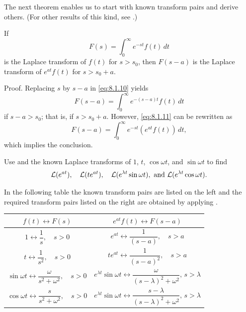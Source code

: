 The next theorem enables us to start with known transform pairs and derive
others. (For other results of this kind, see .)

\begin{theorem}\label{thmtype:8.1.3}
 If
\begin{equation}\label{eq:8.1.10}
F(s)=\int_0^\infty e^{-st} f(t)\,dt
\end{equation}
is the Laplace transform of $f(t)$ for $s>s_0$, then $F(s-a)$ is the
Laplace transform of $e^{at}f(t)$ for $s >s_0+a$.
\end{theorem}

{\sc Proof.} Replacing $s$ by $s-a$ in  \eqref{eq:8.1.10} yields
\begin{equation}\label{eq:8.1.11}
F(s-a)=\int_0^\infty e^{-(s-a)t}f(t)\,dt
\end{equation}
if $s-a>s_0$; that is, if $s>s_0+a$.  However,  \eqref{eq:8.1.11} can
be rewritten as
\[
F(s-a)=\int_0^\infty e^{-st}\left(e^{at}f(t)\right)\,dt,
\]
which implies the conclusion.

\begin{example}\label{example:8.1.7}
  Use  and the known Laplace
transforms of $1$, $t$, $\cos\omega t$, and $\sin\omega t$ to find
\[
{\mathcal L}(e^{at}),\quad {\mathcal L}(te^{at}),\quad {\mathcal L}(e^{\lambda t}\sin
\omega t),\text{ and }{\mathcal L}(e^{\lambda t}\cos\omega t).
\]
\end{example}

\begin{solution}
In the following table the known
transform pairs  are listed on the left and  the required  transform pairs
listed on the right are obtained  by applying
.%
%
\begin{center}
\renewcommand{\arraystretch}{1.8}
\begin{tabular}{c@{\qquad}c}\toprule
$f(t)\leftrightarrow F(s)$ & $e^{at}f(t)\leftrightarrow F(s-a)$ \\\midrule
$1\leftrightarrow\dfrac{1}{s},\quad s>0$ &
 $e^{at}\leftrightarrow\dfrac{1}{(s-a)},\quad s>a$\\
  $t\leftrightarrow\dfrac{1}{s^2},\quad s>0$ &
$te^{at}\leftrightarrow\dfrac{1}{(s-a)^2},\quad s>a$\\
$\sin\omega t\leftrightarrow\dfrac{\omega}{s^2+\omega^2},\quad s>0$&
$e^{\lambda t}\sin\omega t\leftrightarrow\dfrac{\omega}{(s-\lambda)^2+\omega^2},\,s>\lambda$\\
$\cos\omega t\leftrightarrow\dfrac{s}{s^2+\omega^2},\quad s>0$ &
$e^{\lambda t}\sin\omega t\leftrightarrow\dfrac{s-\lambda}{(s-\lambda)^2+\omega^2},\,s>\lambda$\\\bottomrule
\end{tabular}
\end{center}
\end{solution}

